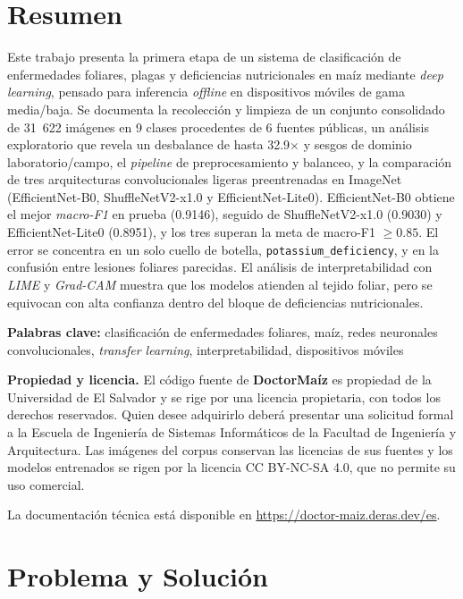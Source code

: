 \documentclass[12pt,letterpaper]{article}
\begin{document}
\section*{Resumen}
Este trabajo presenta la primera etapa de un sistema de clasificaci\'on de enfermedades foliares, plagas y deficiencias nutricionales en ma\'iz mediante \textit{deep learning}, pensado para inferencia \textit{offline} en dispositivos m\'oviles de gama media/baja. Se documenta la recolecci\'on y limpieza de un conjunto consolidado de 31~622 im\'agenes en 9 clases procedentes de 6 fuentes p\'ublicas, un an\'alisis exploratorio que revela un desbalance de hasta 32.9$\times$ y sesgos de dominio laboratorio/campo, el \textit{pipeline} de preprocesamiento y balanceo, y la comparaci\'on de tres arquitecturas convolucionales ligeras preentrenadas en ImageNet (EfficientNet-B0, ShuffleNetV2-x1.0 y EfficientNet-Lite0). EfficientNet-B0 obtiene el mejor \textit{macro-F1} en prueba (0.9146), seguido de ShuffleNetV2-x1.0 (0.9030) y EfficientNet-Lite0 (0.8951), y los tres superan la meta de macro-F1 $\geq0.85$. El error se concentra en un solo cuello de botella, \texttt{potassium\_deficiency}, y en la confusi\'on entre lesiones foliares parecidas. El an\'alisis de interpretabilidad con \textit{LIME} y \textit{Grad-CAM} muestra que los modelos atienden al tejido foliar, pero se equivocan con alta confianza dentro del bloque de deficiencias nutricionales.

\noindent\textbf{Palabras clave:} clasificaci\'on de enfermedades foliares, ma\'iz, redes neuronales convolucionales, \textit{transfer learning}, interpretabilidad, dispositivos m\'oviles

\bigskip
\noindent\textbf{Propiedad y licencia.} El c\'odigo fuente de \textbf{DoctorMa\'iz} es propiedad de la Universidad de El Salvador y se rige por una licencia propietaria, con todos los derechos reservados. Quien desee adquirirlo deber\'a presentar una solicitud formal a la Escuela de Ingenier\'ia de Sistemas Inform\'aticos de la Facultad de Ingenier\'ia y Arquitectura. Las im\'agenes del corpus conservan las licencias de sus fuentes y los modelos entrenados se rigen por la licencia CC BY-NC-SA 4.0, que no permite su uso comercial.

\noindent La documentaci\'on t\'ecnica est\'a disponible en \url{https://doctor-maiz.deras.dev/es}.

\newpage

\section{Problema y Soluci\'on}
\end{document}
